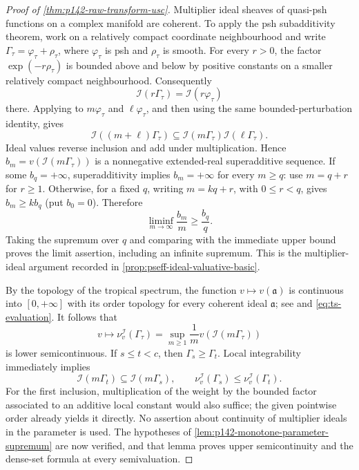 \begin{proof}[Proof of \cref{thm:p142-raw-transform-usc}]
Multiplier ideal sheaves of quasi-psh functions on a complex manifold
are coherent.  To apply the psh subadditivity theorem, work on a relatively
compact coordinate neighbourhood and write
\(\Gamma_\tau=\varphi_\tau+\rho_\tau\), where
\(\varphi_\tau\) is psh and \(\rho_\tau\) is smooth.  For every
\(r>0\), the factor \(\exp(-r\rho_\tau)\) is bounded above and below
by positive constants on a smaller relatively compact neighbourhood.
Consequently
\[
             \mathcal I(r\Gamma_\tau)
             =\mathcal I(r\varphi_\tau)
\]
there.  Applying \cite[Theorem~2.6(ii)]{DEL00} to
\(m\varphi_\tau\) and \(\ell\varphi_\tau\), and then using the
same bounded-perturbation identity, gives
\[
 \mathcal I((m+\ell)\Gamma_\tau)
 \subseteq\mathcal I(m\Gamma_\tau)
               \mathcal I(\ell\Gamma_\tau).
\]
Ideal values reverse inclusion and add under multiplication. Hence
$b_m=v(\mathcal I(m\Gamma_\tau))$ is a nonnegative extended-real
superadditive sequence. If some $b_q=+\infty$, superadditivity implies
$b_m=+\infty$ for every $m\geq q$: use $m=q+r$ for $r\geq1$.
Otherwise, for a fixed $q$, writing $m=kq+r$, with $0\leq r<q$, gives
$b_m\geq kb_q$ (put $b_0=0$). Therefore
\[
 \liminf_{m\to\infty}\frac{b_m}{m}\geq\frac{b_q}{q}.
\]
Taking the supremum over $q$ and comparing with the immediate upper
bound proves the limit assertion, including an infinite supremum. This
is the multiplier-ideal argument recorded in
\cref{prop:pseff-ideal-valuative-basic}.

By the topology of the tropical spectrum, the function
$v\mapsto v(\mathfrak a)$ is continuous into $[0,+\infty]$ with its
order topology for every coherent ideal $\mathfrak a$; see
\cite[Definition~1.3.1]{MP24} and \eqref{eq:ts-evaluation}.
It follows that
\[
 v\longmapsto\nu_v^{\mathcal I}(\Gamma_\tau)
   =\sup_{m\geq1}\frac1m
          v(\mathcal I(m\Gamma_\tau))
\]
is lower semicontinuous. If $s\leq t<c$, then
$\Gamma_s\geq\Gamma_t$. Local integrability immediately implies
\[
 \mathcal I(m\Gamma_t)\subseteq\mathcal I(m\Gamma_s),
 \qquad
 \nu_v^{\mathcal I}(\Gamma_s)
       \leq\nu_v^{\mathcal I}(\Gamma_t).
\]
For the first inclusion, multiplication of the weight by the bounded
factor associated to an additive local constant would also suffice;
the given pointwise order already yields it directly. No assertion
about continuity of multiplier ideals in the parameter is used.
The hypotheses of \cref{lem:p142-monotone-parameter-supremum} are now
verified, and that lemma proves upper semicontinuity and the dense-set
formula at every semivaluation.


\end{proof}
